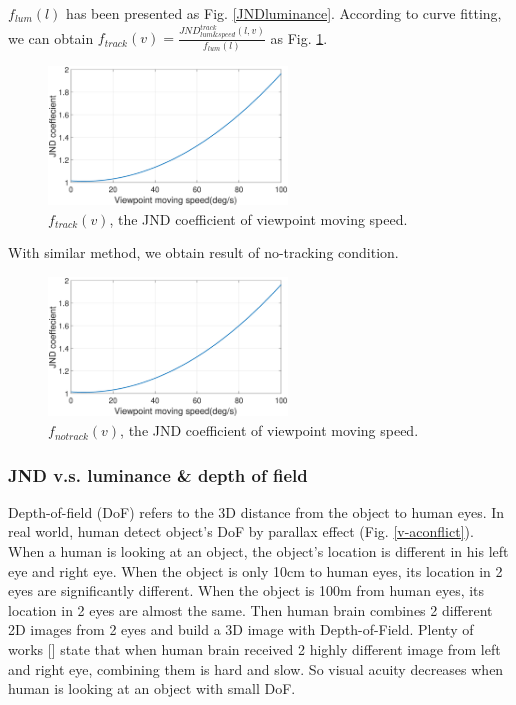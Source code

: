 $f_{lum}(l)$ has been presented as Fig. \ref{JNDluminance}. According to curve fitting, we can obtain $f_{track}(v) = \frac{JND_{lum\&speed}^{track}(l, v)}{f_{lum}(l)}$ as Fig. \ref{JNDspeed-track}.

\begin{figure}
  \centering
  \includegraphics[width=2.5in]{images/JNDspeed.eps}
  \caption{$f_{track}(v)$, the JND coefficient of viewpoint moving speed.}
  \label{JNDspeed-track}
  \end{figure}

With similar method, we obtain result of no-tracking condition. 

\begin{figure}
  \centering
  \includegraphics[width=2.5in]{images/JNDspeed.eps}
  \caption{$f_{notrack}(v)$, the JND coefficient of viewpoint moving speed.}
  \label{JNDspeed-notrack}
  \end{figure}

\subsubsection{JND v.s. luminance \& depth of field}

Depth-of-field (DoF) refers to the 3D distance from the object to human eyes. In real world, human detect object's DoF by parallax effect (Fig. \ref{v-aconflict}). When a human is looking at an object, the object's location is different in his left eye and right eye. When the object is only 10cm to human eyes, its location in 2 eyes are significantly different. When the object is 100m from human eyes, its location in 2 eyes are almost the same. Then human brain combines 2 different 2D images from 2 eyes and build a 3D image with Depth-of-Field. Plenty of works [] state that when human brain received 2 highly different image from left and right eye, combining them is hard and slow. So visual acuity decreases when human is looking at an object with small DoF.

